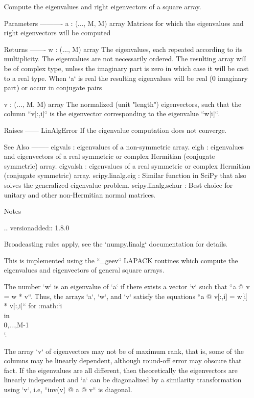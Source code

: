 \begin{DoxyVerb}Compute the eigenvalues and right eigenvectors of a square array.

Parameters
----------
a : (..., M, M) array
    Matrices for which the eigenvalues and right eigenvectors will
    be computed

Returns
-------
w : (..., M) array
    The eigenvalues, each repeated according to its multiplicity.
    The eigenvalues are not necessarily ordered. The resulting
    array will be of complex type, unless the imaginary part is
    zero in which case it will be cast to a real type. When `a`
    is real the resulting eigenvalues will be real (0 imaginary
    part) or occur in conjugate pairs

v : (..., M, M) array
    The normalized (unit "length") eigenvectors, such that the
    column ``v[:,i]`` is the eigenvector corresponding to the
    eigenvalue ``w[i]``.

Raises
------
LinAlgError
    If the eigenvalue computation does not converge.

See Also
--------
eigvals : eigenvalues of a non-symmetric array.
eigh : eigenvalues and eigenvectors of a real symmetric or complex
       Hermitian (conjugate symmetric) array.
eigvalsh : eigenvalues of a real symmetric or complex Hermitian
           (conjugate symmetric) array.
scipy.linalg.eig : Similar function in SciPy that also solves the
                   generalized eigenvalue problem.
scipy.linalg.schur : Best choice for unitary and other non-Hermitian
                     normal matrices.

Notes
-----

.. versionadded:: 1.8.0

Broadcasting rules apply, see the `numpy.linalg` documentation for
details.

This is implemented using the ``_geev`` LAPACK routines which compute
the eigenvalues and eigenvectors of general square arrays.

The number `w` is an eigenvalue of `a` if there exists a vector
`v` such that ``a @ v = w * v``. Thus, the arrays `a`, `w`, and
`v` satisfy the equations ``a @ v[:,i] = w[i] * v[:,i]``
for :math:`i \\in \\{0,...,M-1\\}`.

The array `v` of eigenvectors may not be of maximum rank, that is, some
of the columns may be linearly dependent, although round-off error may
obscure that fact. If the eigenvalues are all different, then theoretically
the eigenvectors are linearly independent and `a` can be diagonalized by
a similarity transformation using `v`, i.e, ``inv(v) @ a @ v`` is diagonal.


\end{DoxyVerb}
